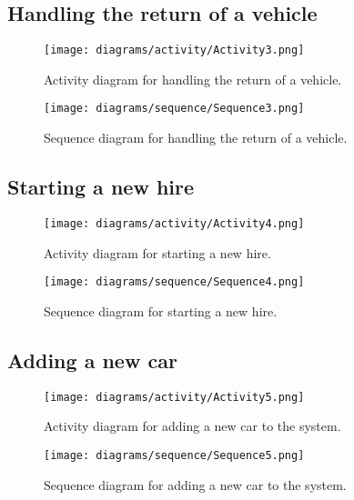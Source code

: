  \subsection{Handling the return of a vehicle}
    \begin{figure}[H]
      \centering
      \texttt{[image: diagrams/activity/Activity3.png]}
      \caption{Activity diagram for handling the return of a vehicle.}
      \label{fig:vehicleReturnActivity}
    \end{figure}

    \begin{figure}[H]
      \centering
      \texttt{[image: diagrams/sequence/Sequence3.png]}
      \caption{Sequence diagram for handling the return of a vehicle.}
      \label{fig:vehicleReturnSequence}
    \end{figure}
  \newpage

  \subsection{Starting a new hire}
    \begin{figure}[H]
      \centering
      \texttt{[image: diagrams/activity/Activity4.png]}
      \caption{Activity diagram for starting a new hire.}
      \label{fig:hireStartActivity}
    \end{figure}

    \begin{figure}[H]
      \centering
      \texttt{[image: diagrams/sequence/Sequence4.png]}
      \caption{Sequence diagram for starting a new hire.}
      \label{fig:startHireSequence}
    \end{figure}
  \newpage

  \subsection{Adding a new car}

    \begin{figure}[H]
      \centering
      \texttt{[image: diagrams/activity/Activity5.png]}
      \caption{Activity diagram for adding a new car to the system.}
      \label{fig:newCarActivity}
    \end{figure}

    \begin{figure}[H]
      \centering
      \texttt{[image: diagrams/sequence/Sequence5.png]}
      \caption{Sequence diagram for adding a new car to the system.}
      \label{fig:newCarSequence}
    \end{figure}

\newpage